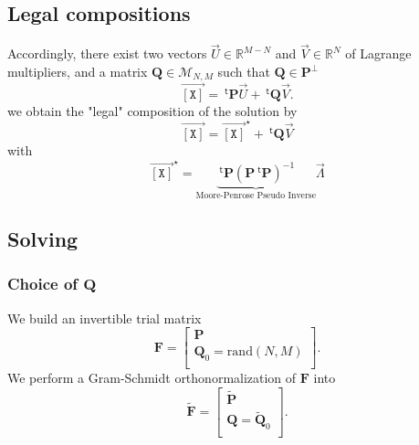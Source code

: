 \documentclass[aps,twocolumn]{revtex4}
\newcommand{\myconc}[1]{\left\lbrack #1 \right\rbrack}
\newcommand{\mychem}[1]{{\mathtt{#1}}}
\newcommand{\mymat}[1]{\boldsymbol{#1}}
\newcommand{\mytrn}[1]{{\!\!~^{\mathsf{t}}{#1}}}
\newcommand{\myvec}[1]{\overrightarrow{#1}}
\newcommand{\vecX}{\myvec{\myconc{\mychem{X}}}}
\begin{document}
\subsection{Legal compositions}
Accordingly, there exist two vectors $\vec{U}\in\mathbb{R}^{M-N}$ and $\vec{V}\in \mathbb{R}^{N}$ of Lagrange multipliers, and
a matrix  $\mymat{Q}\in\mathcal{M}_{N,M}$ such that $\mymat{Q}\in\mymat{P}^\perp$
\begin{equation}
	\vecX = \mytrn{\mymat{P}} \vec{U} + \mytrn{\mymat{Q}}\vec{V}.
\end{equation}
we obtain the "legal" composition of the solution by
\begin{equation}
	\vecX = \vecX^\star + \mytrn{\mymat{Q}}\vec{V}
\end{equation}
with 
\begin{equation}
	\vecX^\star= \underbrace{\mytrn{\mymat{P}} \left(\mymat{P} \mytrn{\mymat{P}}\right)^{-1}}_{\text{Moore-Penrose Pseudo Inverse}} \vec{\Lambda}
\end{equation}

\subsection{Solving}
\subsubsection{Choice of $\mymat{Q}$}
We build an invertible trial matrix
\begin{equation}
	\mymat{F} = 
	\left\lbrack
	\begin{array}{c}
		\mymat{P}\\
		\mymat{Q}_0=\text{rand}(N,M)\\
	\end{array}
	\right\rbrack.
\end{equation}
We perform a Gram-Schmidt orthonormalization of $\mymat{F}$ into
\begin{equation}
	\tilde{\mymat{F}} = 
	\left\lbrack
	\begin{array}{c}
		\tilde{\mymat{P}}\\
		\mymat{Q}=\tilde{\mymat{Q}}_0\\
	\end{array}
	\right\rbrack.
\end{equation}
\end{document}
